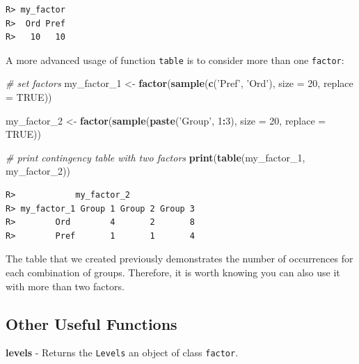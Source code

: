 \documentclass[
  12pt,
]{book}
\newenvironment{Shaded}{\begin{snugshade}}{\end{snugshade}}
\newcommand{\CommentTok}[1]{\textcolor[rgb]{0.37,0.37,0.37}{\textit{#1}}}
\newcommand{\DataTypeTok}[1]{\textcolor[rgb]{0.27,0.27,0.27}{#1}}
\newcommand{\DecValTok}[1]{\textcolor[rgb]{0.06,0.06,0.06}{#1}}
\newcommand{\KeywordTok}[1]{\textcolor[rgb]{0.27,0.27,0.27}{\textbf{#1}}}
\newcommand{\NormalTok}[1]{#1}
\newcommand{\OperatorTok}[1]{\textcolor[rgb]{0.43,0.43,0.43}{\textbf{#1}}}
\newcommand{\OtherTok}[1]{\textcolor[rgb]{0.37,0.37,0.37}{#1}}
\newcommand{\StringTok}[1]{\textcolor[rgb]{0.5,0.5,0.5}{#1}}
\begin{document}
\begin{verbatim}
R> my_factor
R>  Ord Pref 
R>   10   10
\end{verbatim}

A more advanced usage of function \texttt{table} is to consider more than one \texttt{factor}:

\begin{Shaded}
\begin{Highlighting}[]
\CommentTok{# set factors}
\NormalTok{my_factor_}\DecValTok{1}\NormalTok{ <-}\StringTok{ }\KeywordTok{factor}\NormalTok{(}\KeywordTok{sample}\NormalTok{(}\KeywordTok{c}\NormalTok{(}\StringTok{'Pref'}\NormalTok{, }\StringTok{'Ord'}\NormalTok{),}
                             \DataTypeTok{size =} \DecValTok{20}\NormalTok{,}
                             \DataTypeTok{replace =} \OtherTok{TRUE}\NormalTok{))}

\NormalTok{my_factor_}\DecValTok{2}\NormalTok{ <-}\StringTok{ }\KeywordTok{factor}\NormalTok{(}\KeywordTok{sample}\NormalTok{(}\KeywordTok{paste}\NormalTok{(}\StringTok{'Group'}\NormalTok{, }\DecValTok{1}\OperatorTok{:}\DecValTok{3}\NormalTok{),}
                             \DataTypeTok{size =} \DecValTok{20}\NormalTok{,}
                             \DataTypeTok{replace =} \OtherTok{TRUE}\NormalTok{))}

\CommentTok{# print contingency table with two factors}
\KeywordTok{print}\NormalTok{(}\KeywordTok{table}\NormalTok{(my_factor_}\DecValTok{1}\NormalTok{, }
\NormalTok{            my_factor_}\DecValTok{2}\NormalTok{))}
\end{Highlighting}
\end{Shaded}

\begin{verbatim}
R>            my_factor_2
R> my_factor_1 Group 1 Group 2 Group 3
R>        Ord        4       2       8
R>        Pref       1       1       4
\end{verbatim}

The table that we created previously demonstrates the number of occurrences for each combination of groups. Therefore, it is worth knowing you can also use it with more than two factors.

\hypertarget{other-useful-functions-4}{%
\subsection{Other Useful Functions}\label{other-useful-functions-4}}

\textbf{levels} - Returns the \texttt{Levels} an object of class \texttt{factor}. 
\end{document}
